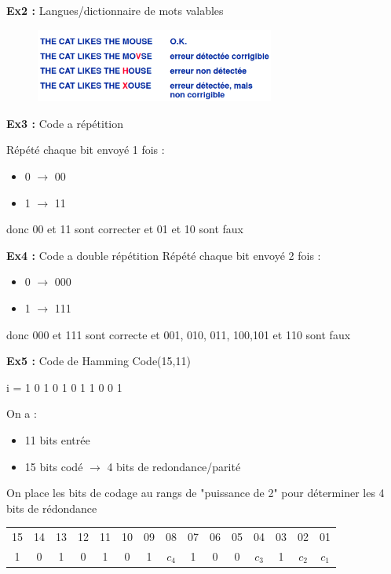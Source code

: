 			\newpage
				
			\textbf{Ex2 :} Langues/dictionnaire de mots valables
			
			\begin{figure}[htp]
				\centering
				\includegraphics[width=0.7\textwidth]{img/Erreur2.png}
			\end{figure}
			
			\textbf{Ex3 : }Code a répétition
		
				Répété chaque bit envoyé 1 fois :
				\begin{itemize}
					\item 0 $\rightarrow$ 00
					\item 1 $\rightarrow$ 11
				\end{itemize}
				
				donc 00 et 11 sont correcter et 01 et 10 sont faux
				
			\textbf{Ex4 : }Code a double répétition
				Répété chaque bit envoyé 2 fois :
				\begin{itemize}
					\item 0 $\rightarrow$ 000
					\item 1 $\rightarrow$ 111
				\end{itemize}
				
				donc 000 et 111 sont correcte et 001, 010, 011, 100,101 et 110 sont faux
				
			\textbf{Ex5 :} Code de Hamming
				Code(15,11)
				
				i = 1 0 1 0 1 0 1 1 0 0 1
				
				On a :
				\begin{itemize}
					\item 11 bits entrée
					\item 15 bits codé $\rightarrow$ 4 bits de redondance/parité
				\end{itemize}
				
				On place les bits de codage au rangs de "puissance de 2" pour déterminer les 4 bits de rédondance
				
				\begin{tabular}{ccccccccccccccc}
					15 & 14 & 13 & 12 & 11 & 10 & 09 & 08 & 07 & 06 & 05 & 04 & 03 & 02 & 01\\
					1 & 0 & 1 & 0 & 1 & 0 & 1 & $c_4$ & 1 & 0 & 0 & $c_3$ & 1 & $c_2$ & $c_1$ 
				\end{tabular}
				
